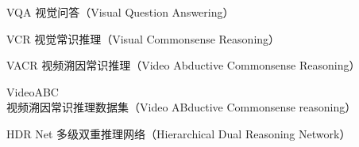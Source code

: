 
\begin{denotation}[3cm]
\item[VQA] 视觉问答（Visual Question Answering）
\item[VCR] 视觉常识推理（Visual Commonsense Reasoning）
\item[VACR] 视频溯因常识推理（Video Abductive Commonsense Reasoning） 
\item[VideoABC] 视频溯因常识推理数据集（Video ABductive Commonsense reasoning）
\item[HDR Net] 多级双重推理网络（Hierarchical Dual Reasoning Network）
\end{denotation}